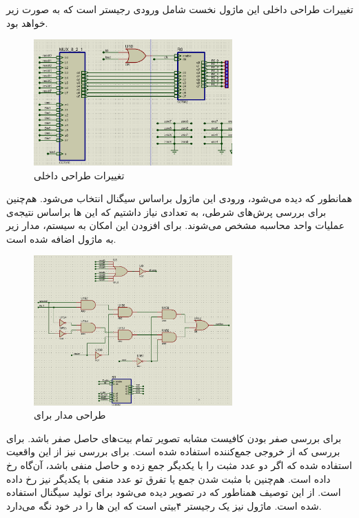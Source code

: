 \documentclass[12pt,onecolumn,a4paper,fleqn]{article}
\begin{document}
	تغییرات طراحی داخلی این ماژول نخست شامل ورودی رجیستر 
	است که به صورت زیر خواهد بود.
	\begin{figure}[H]
		\centering
		\includegraphics[width=0.68\textwidth]{source/alu1_inner.png}
		\caption{تغییرات طراحی داخلی }
		\label{fig:alu1-inner}
	\end{figure}
	همانطور که دیده می‌شود، ورودی این ماژول براساس سیگنال  انتخاب می‌شود. هم‌چنین برای بررسی پرش‌های شرطی، به تعدادی  نیاز داشتیم که این ها براساس نتیجه‌ی عملیات واحد محاسبه مشخص می‌شوند. برای افزودن این امکان به سیستم، مدار زیر به ماژول اضافه شده است.
	\begin{figure}[H]
		\centering
		\includegraphics[width=0.68\textwidth]{source/sr.png}
		\caption{طراحی مدار برای }
		\label{fig:sr-inner}
	\end{figure}
	برای بررسی صفر بودن کافیست مشابه تصویر  تمام بیت‌های حاصل صفر باشد. برای بررسی  که از خروجی  جمع‌کننده استفاده شده است. برای بررسی  نیز از این واقعیت استفاده شده که اگر دو عدد مثبت را با یکدیگر جمع زده و حاصل منفی باشد، آن‌گاه  رخ داده است. هم‌چنین با مثبت شدن جمع یا تفرق تو عدد منفی با یکدیگر نیز  رخ داده است. از این توصیف همناطور که در تصویر دیده می‌شود برای تولید سیگنال  استفاده شده است. ماژول  نیز یک رجیستر ۴بیتی است که این ها را در خود نگه می‌دارد.
	
\end{document}

